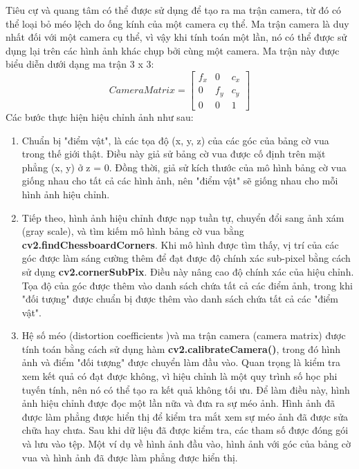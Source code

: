 \noindent Tiêu cự và quang tâm có thể được sử dụng để tạo ra ma trận camera, từ đó có thể loại bỏ méo lệch do ống kính của một camera cụ thể. Ma trận camera là duy nhất đối với một camera cụ thể, vì vậy khi tính toán một lần, nó có thể được sử dụng lại trên các hình ảnh khác chụp bởi cùng một camera. Ma trận này được biểu diễn dưới dạng ma trận 3 x 3: 
\[
Camera Matrix = 
\left[
\begin{array}{ccc}
    f_x & 0 & c_x \\
    0 & f_y & c_y \\
    0 & 0 & 1
\end{array}
\right]
\]
Các bước thực hiện hiệu chỉnh ảnh như sau:
\begin{enumerate}
    \item Chuẩn bị "điểm vật", là các tọa độ (x, y, z) của các góc của bảng cờ vua trong thế giới thật. Điều này giả sử bảng cờ vua được cố định trên mặt phẳng (x, y) ở z = 0. Đồng thời, giả sử kích thước của mô hình bảng cờ vua giống nhau cho tất cả các hình ảnh, nên "điểm vật" sẽ giống nhau cho mỗi hình ảnh hiệu chỉnh.
    \item Tiếp theo, hình ảnh hiệu chỉnh được nạp tuần tự, chuyển đổi sang ảnh xám (gray scale), và tìm kiếm mô hình bảng cờ vua bằng \textbf{cv2.findChessboardCorners}. Khi mô hình được tìm thấy, vị trí của các góc được làm sáng cường thêm để đạt được độ chính xác sub-pixel bằng cách sử dụng \textbf{cv2.cornerSubPix}. Điều này nâng cao độ chính xác của hiệu chỉnh. Tọa độ của góc được thêm vào danh sách chứa tất cả các điểm ảnh, trong khi "đối tượng" được chuẩn bị được thêm vào danh sách chứa tất cả các "điểm vật".
    \item Hệ số méo (distortion coefficients )và ma trận camera (camera matrix) được tính toán bằng cách sử dụng hàm \textbf{cv2.calibrateCamera()}, trong đó hình ảnh và điểm "đối tượng" được chuyển làm đầu vào. Quan trọng là kiểm tra xem kết quả có đạt được không, vì hiệu chỉnh là một quy trình số học phi tuyến tính, nên nó có thể tạo ra kết quả không tối ưu. Để làm điều này, hình ảnh hiệu chỉnh được đọc một lần nữa và đưa ra sự méo ảnh. Hình ảnh đã được làm phẳng được hiển thị để kiểm tra mắt xem sự méo ảnh đã được sửa chữa hay chưa. Sau khi dữ liệu đã được kiểm tra, các tham số được đóng gói và lưu vào tệp. Một ví dụ về hình ảnh đầu vào, hình ảnh với góc của bảng cờ vua và hình ảnh đã được làm phẳng được hiển thị.
\end{enumerate}
